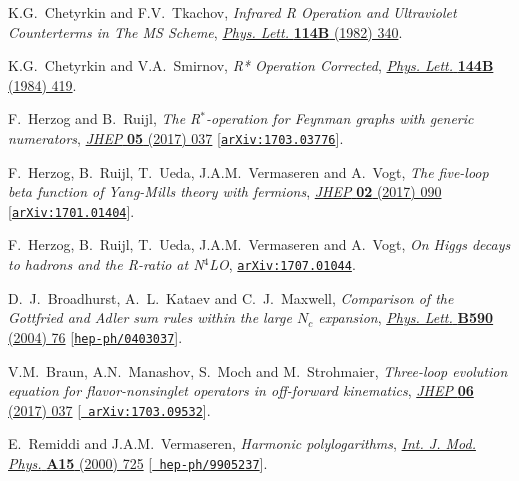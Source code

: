 \documentclass[12pt]{article}
\begin{document}
{\begin{thebibliography}{100}
K.G.~Chetyrkin and F.V.~Tkachov, \emph{{Infrared R Operation and Ultraviolet
  Counterterms in The MS Scheme}},
  \href{https://dx.doi.org/10.1016/0370-2693(82)90358-6}{\emph{Phys. Lett.}
  {\bf 114B} (1982) 340}.

K.G.~Chetyrkin and V.A.~Smirnov, \emph{{R* Operation Corrected}},
  \href{https://dx.doi.org/10.1016/0370-2693(84)91291-7}{\emph{Phys. Lett.}
  {\bf 144B} (1984) 419}.

F.~Herzog and B.~Ruijl, \emph{{The R$^{*}$-operation for Feynman graphs with
  generic numerators}},
  \href{https://dx.doi.org/10.1007/JHEP05(2017)037}{\emph{JHEP} {\bf 05} (2017)
  037} [\href{https://arxiv.org/abs/1703.03776}{{\tt arXiv:1703.03776}}].

F.~Herzog, B.~Ruijl, T.~Ueda, J.A.M.~Vermaseren and A.~Vogt, \emph{{The
  five-loop beta function of Yang-Mills theory with fermions}},
  \href{https://dx.doi.org/10.1007/JHEP02(2017)090}{\emph{JHEP} {\bf 02} (2017)
  090} [\href{https://arxiv.org/abs/1701.01404}{{\tt arXiv:1701.01404}}].

F.~Herzog, B.~Ruijl, T.~Ueda, J.A.M.~Vermaseren and A.~Vogt, \emph{{On Higgs
  decays to hadrons and the R-ratio at N$^4$LO}},
  \href{https://arxiv.org/abs/1707.01044}{{\tt arXiv:1707.01044}}.

  D.~J.~Broadhurst, A.~L.~Kataev and C.~J.~Maxwell,
  \emph{{Comparison of the Gottfried and Adler sum rules within the large $N_c$ expansion}},
  \href{https://dx.doi.org/10.1016/j.physletb.2004.03.059}{\emph{Phys. Lett.}
  {\bf B590} (2004) 76} [\href{https://arxiv.org/abs/hep-ph/0403037}{{\tt hep-ph/0403037}}].

V.M.~Braun, A.N.~Manashov, S.~Moch and M.~Strohmaier, \emph{{Three-loop
  evolution equation for flavor-nonsinglet operators in off-forward
  kinematics}}, \href{https://dx.doi.org/10.1007/JHEP06(2017)037}{\emph{JHEP}
  {\bf 06} (2017) 037} [\href{https://arxiv.org/abs/1703.09532}{{\tt
  arXiv:1703.09532}}].

E.~Remiddi and J.A.M.~Vermaseren, \emph{{Harmonic polylogarithms}},
  \href{https://dx.doi.org/10.1142/S0217751X00000367}{\emph{Int. J. Mod. Phys.}
  {\bf A15} (2000) 725} [\href{https://arxiv.org/abs/hep-ph/9905237}{{\tt
  hep-ph/9905237}}].


\end{thebibliography}}
\end{document}

